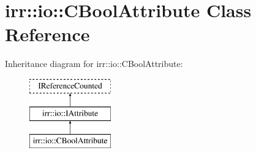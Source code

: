 \hypertarget{classirr_1_1io_1_1_c_bool_attribute}{\section{irr\-:\-:io\-:\-:C\-Bool\-Attribute Class Reference}
\label{classirr_1_1io_1_1_c_bool_attribute}
}
Inheritance diagram for irr\-:\-:io\-:\-:C\-Bool\-Attribute\-:\begin{figure}[H]
\begin{center}
\leavevmode
\includegraphics[height=3.000000cm]{classirr_1_1io_1_1_c_bool_attribute}
\end{center}
\end{figure}
